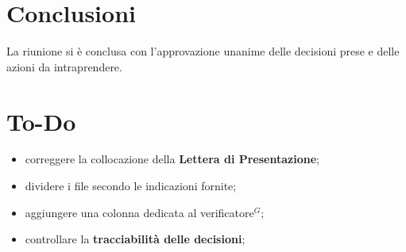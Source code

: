 \documentclass[a4paper,10pt]{article}
\begin{document}
\vspace{0.5cm}

\section*{Conclusioni}

La riunione si è conclusa con l’approvazione unanime delle decisioni prese e delle azioni da intraprendere.

\vspace{0.5cm}

\section*{To-Do}
\begin{itemize}
    \item correggere la collocazione della \textbf{Lettera di Presentazione};
    \item dividere i file secondo le indicazioni fornite;
    \item aggiungere una colonna dedicata al verificatore$^G$;
    \item controllare la \textbf{tracciabilità delle decisioni};
\end{itemize}
\end{document}
